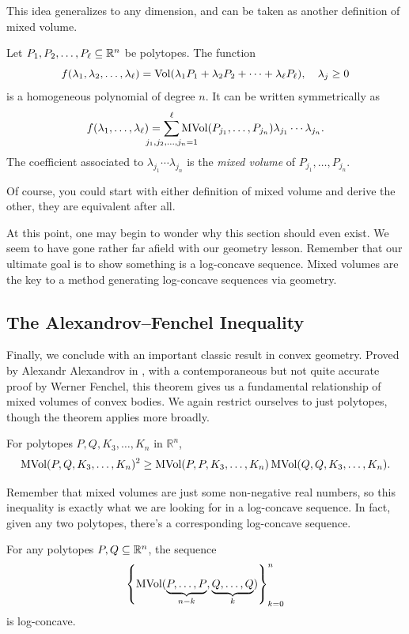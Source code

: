 \documentclass[12pt,oneside]{../../sfsuthesis}
\begin{document}
This idea generalizes to any dimension, and can be taken as another definition of mixed volume.
\begin{definition}
    Let  \( P_1, P_2, \dots, P_\ell \subseteq \mathbb{R}^n \) be polytopes.
    The function
    \[
        f(\lambda_1, \lambda_2, \dots, \lambda_\ell)  = \operatorname{Vol}(\lambda_1 P_1 + \lambda_2 P_2 + \cdots + \lambda_\ell P_\ell), \quad \lambda_j \geq 0
    \]
    is a homogeneous polynomial of degree \( n \).
    It can be written symmetrically as
    \[
        f(\lambda_1, \dots, \lambda_\ell) = \sum_{\mathclap{j_1, j_2, \dots, j_n = 1}}^{\ell} \MVol(P_{j_1}, \dots, P_{j_n})\lambda_{j_1} \cdots \lambda_{j_n}.
    \]
    The coefficient associated to \( \lambda_{j_1} \cdots \lambda_{j_n} \) is the \emph{mixed volume} of \( P_{j_1}, \dots, P_{j_n} \).

\end{definition}
Of course, you could start with either definition of mixed volume and derive the other, they are equivalent after all.

At this point, one may begin to wonder why this section should even exist.
We seem to have gone rather far afield with our geometry lesson.
Remember that our ultimate goal is to show something is a log-concave sequence.
Mixed volumes are the key to a method generating log-concave sequences via geometry.

\subsection{The Alexandrov–Fenchel Inequality}
Finally, we conclude with an important classic result in convex geometry.
Proved by Alexandr Alexandrov in \cite{aleksandrovZurTheorieGemischter1937}, with a contemporaneous but not quite accurate proof by Werner Fenchel, this theorem gives us a fundamental relationship of mixed volumes of convex bodies.
We again restrict ourselves to just polytopes, though the theorem applies more broadly.
\begin{theorem}\th\label{thm:AFIneq}
    For polytopes \( P, Q, K_3, \dots, K_n \) in \( \mathbb{R}^n \),
    \begin{gather*}
        \operatorname{MVol}(P,Q, K_3, \dots, K_n)^2 \geq \operatorname{MVol}( P, P, K_3, \dots, K_n) \operatorname{MVol}( Q, Q, K_3, \dots, K_n).
    \end{gather*}
\end{theorem}
Remember that mixed volumes are just some non-negative real numbers, so this inequality is exactly what we are looking for in a log-concave sequence.
In fact, given any two polytopes, there's a corresponding log-concave sequence.
\begin{corollary}\th\label{thm:AFSequence}
    For any polytopes \( P, Q \subseteq \mathbb{R}^n \), the sequence
    \[
        \left\{ \operatorname{MVol}(\underbrace{P,\ldots,P}_{n-k},\underbrace{Q,\ldots,Q}_{k}) \right\}_{k=0}^{n}
    \]
    is log-concave.
\end{corollary}
\end{document}
